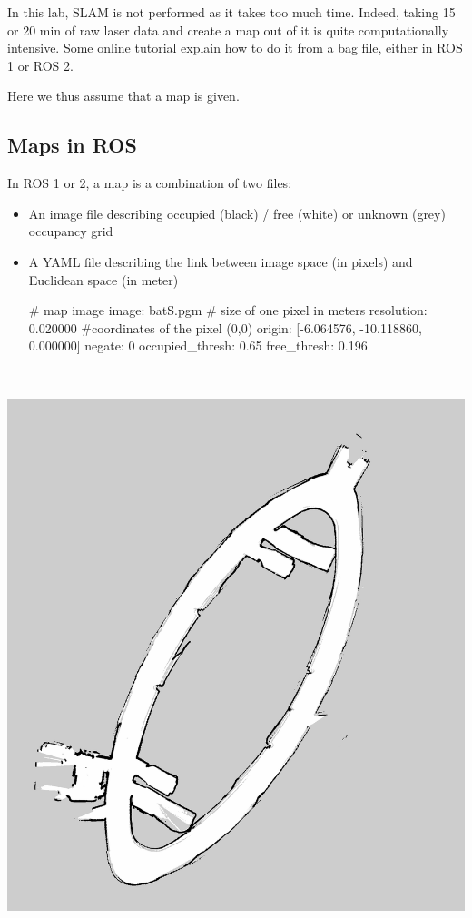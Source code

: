 \documentclass{ecnreport}
\begin{document}
In this lab, SLAM is not performed as it takes too much time. Indeed, taking 15 or 20 min of raw laser data and create a map out of it is quite computationally intensive. Some online tutorial explain how to do it from a bag file, either in ROS 1 or ROS 2.

Here we thus assume that a map is given.

\subsection{Maps in ROS}

In ROS 1 or 2, a map is a combination of two files:\\

\begin{minipage}{.6\linewidth}
 \begin{itemize}
  \item An image file describing occupied (black) / free (white) or unknown (grey) occupancy grid
  \item A YAML file describing the link between image space (in pixels) and Euclidean space (in meter)
  \begin{pythoncodelarge}
# map image
image: batS.pgm  
# size of one pixel in meters
resolution: 0.020000
#coordinates of the pixel (0,0)
origin: [-6.064576, -10.118860, 0.000000]
negate: 0
occupied_thresh: 0.65 
free_thresh: 0.196
  \end{pythoncodelarge}
 \end{itemize} 
\end{minipage}
\begin{minipage}{.05\linewidth}
 ~
\end{minipage}
\begin{minipage}{.33\linewidth}
 \includegraphics[width=\linewidth]{batS}
\end{minipage}~\\
\end{document}

